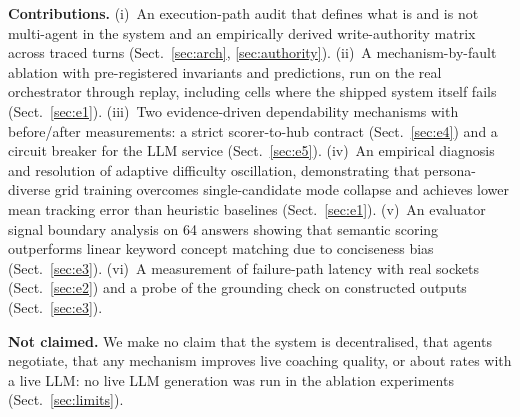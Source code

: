 \documentclass[runningheads]{llncs}
\begin{document}
\noindent\textbf{Contributions.} (i)~An execution-path audit that defines what is and is not multi-agent in the system and an empirically derived write-authority matrix across \nTurns{} traced turns (Sect.~\ref{sec:arch}, \ref{sec:authority}). (ii)~A mechanism-by-fault ablation with pre-registered invariants and predictions, run on the real orchestrator through replay, including cells where the shipped system itself fails (Sect.~\ref{sec:e1}). (iii)~Two evidence-driven dependability mechanisms with before/after measurements: a strict scorer-to-hub contract (Sect.~\ref{sec:e4}) and a circuit breaker for the LLM service (Sect.~\ref{sec:e5}). (iv)~An empirical diagnosis and resolution of adaptive difficulty oscillation, demonstrating that persona-diverse grid training overcomes single-candidate mode collapse and achieves lower mean tracking error than heuristic baselines (Sect.~\ref{sec:e1}). (v)~An evaluator signal boundary analysis on 64 answers showing that semantic scoring outperforms linear keyword concept matching due to conciseness bias (Sect.~\ref{sec:e3}). (vi)~A measurement of failure-path latency with real sockets (Sect.~\ref{sec:e2}) and a probe of the grounding check on constructed outputs (Sect.~\ref{sec:e3}).

\noindent\textbf{Not claimed.} We make no claim that the system is decentralised, that agents negotiate, that any mechanism improves live coaching quality, or about rates with a live LLM: no live LLM generation was run in the ablation experiments (Sect.~\ref{sec:limits}).
\end{document}
